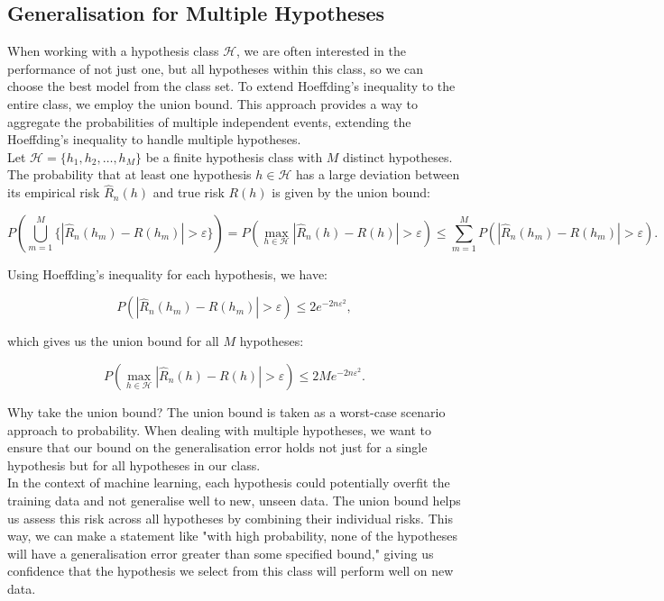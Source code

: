 \subsection{Generalisation for Multiple Hypotheses}
When working with a hypothesis class \( \mathcal{H} \), we are often interested in the performance of not just one, but all hypotheses within this class, so we can choose the best model from the class set. To extend Hoeffding's inequality to the entire class, we employ the union bound. This approach provides a way to aggregate the probabilities of multiple independent events, extending the Hoeffding's inequality to handle multiple hypotheses.\\

     Let \( \mathcal{H} = \{h_1, h_2, \ldots, h_M\} \) be a finite hypothesis class with \( M \) distinct hypotheses. The probability that at least one hypothesis \( h \in \mathcal{H} \) has a large deviation between its empirical risk \( \widehat{R}_n(h) \) and true risk \( R(h) \) is given by the union bound:

    \[P\left( \bigcup_{m=1}^{M} \{ |\widehat{R}_n(h_m) - R(h_m)| > \varepsilon \} \right) = 
    P\left( \max_{h \in \mathcal{H}} |\widehat{R}_n(h) - R(h)| > \varepsilon \right) \leq \sum_{m=1}^{M} P\left( |\widehat{R}_n(h_m) - R(h_m)| > \varepsilon \right).
    \]

    Using Hoeffding's inequality for each hypothesis, we have:

    \[
    P\left( |\widehat{R}_n(h_m) - R(h_m)| > \varepsilon \right) \leq 2e^{-2n\varepsilon^2},
    \]

    which gives us the union bound for all \( M \) hypotheses:

    \begin{equation}
    P\left( \max_{h \in \mathcal{H}} |\widehat{R}_n(h) - R(h)| > \varepsilon \right) \leq 2Me^{-2n\varepsilon^2}.
    \label{eq:union_bound}
    \end{equation}

    \begin{commentbox}{Why take the union bound?}
        The union bound is taken as a worst-case scenario approach to probability. When dealing with multiple hypotheses, we want to ensure that our bound on the generalisation error holds not just for a single hypothesis but for all hypotheses in our class.\\

        In the context of machine learning, each hypothesis could potentially overfit the training data and not generalise well to new, unseen data. The union bound helps us assess this risk across all hypotheses by combining their individual risks. This way, we can make a statement like "with high probability, none of the hypotheses will have a generalisation error greater than some specified bound," giving us confidence that the hypothesis we select from this class will perform well on new data.
    \end{commentbox}


